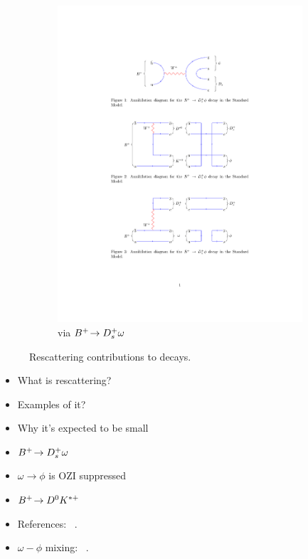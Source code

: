 \begin{figure}[!h]
\begin{subfigure}[m]{0.7\textwidth}
        \includegraphics[width=1.0\textwidth]{figs/Theory/B2DsPhi_Rescattering_B2Dsomega.pdf}
        \caption{via ${{{B}^+}}\!\rightarrow {\ensuremath{{D}^+_{s}}}\omega$}
    \end{subfigure}
    \caption{Rescattering contributions to \decay{\Bp}{\Dsp\phiz} decays.}
    \label{fig:Theory_rescattering}   
\end{figure}



{\color{Red}
\begin{itemize}
\item What is rescattering?
\item Examples of it?
\item Why it's expected to be small
\item ${{B}^+}\!\rightarrow {\ensuremath{{D}^+_{s}}}\omega$
\item $\omega\to\phi$ is OZI suppressed 
\item ${{B}^+}\!\rightarrow {\ensuremath{{D}^0}}{\ensuremath{{K}^{*+}}}$
\item References: \Dp\Kstarz~\cite{Mehraban2016}.
\item $\omega - \phi$ mixing: ~\cite{OKUBO1963165,PhysRevD.79.074006}.

\end{itemize}}

